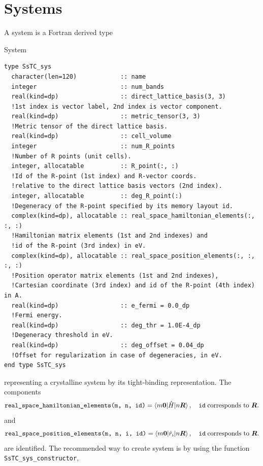 \documentclass[10pt,a4paper]{article}
\begin{document}
\section{Systems}
A system is a Fortran derived type
\begin{codebox}{System}
\begin{lstlisting}[caption={Derived type corresponding to a system.},captionpos=b]
type SsTC_sys
  character(len=120)            :: name
  integer                       :: num_bands
  real(kind=dp)                 :: direct_lattice_basis(3, 3)
  !1st index is vector label, 2nd index is vector component.
  real(kind=dp)                 :: metric_tensor(3, 3)
  !Metric tensor of the direct lattice basis.
  real(kind=dp)                 :: cell_volume
  integer                       :: num_R_points
  !Number of R points (unit cells).
  integer, allocatable          :: R_point(:, :)
  !Id of the R-point (1st index) and R-vector coords. 
  !relative to the direct lattice basis vectors (2nd index).
  integer, allocatable          :: deg_R_point(:)
  !Degeneracy of the R-point specified by its memory layout id.
  complex(kind=dp), allocatable :: real_space_hamiltonian_elements(:, :, :)
  !Hamiltonian matrix elements (1st and 2nd indexes) and 
  !id of the R-point (3rd index) in eV.
  complex(kind=dp), allocatable :: real_space_position_elements(:, :, :, :) 
  !Position operator matrix elements (1st and 2nd indexes), 
  !Cartesian coordinate (3rd index) and id of the R-point (4th index) in A.
  real(kind=dp)                 :: e_fermi = 0.0_dp
  !Fermi energy.
  real(kind=dp)                 :: deg_thr = 1.0E-4_dp
  !Degeneracy threshold in eV.
  real(kind=dp)                 :: deg_offset = 0.04_dp
  !Offset for regularization in case of degeneracies, in eV.
end type SsTC_sys
\end{lstlisting}
\end{codebox}
representing a crystalline system by its tight-binding \cite{marzariMaximallyLocalizedWannier2012} representation. The components
\begin{equation}
\verb|real_space_hamiltonian_elements(m, n, id)| = \braket{m\bm{0}|\hat{H}|n\bm{R}},\quad \verb|id|\;\text{corresponds to }\bm{R}.
\end{equation}
and
\begin{equation}
\verb|real_space_position_elements(m, n, i, id)| = \braket{m\bm{0}|\hat{r}_i|n\bm{R}},\quad \verb|id|\;\text{corresponds to }\bm{R}.
\end{equation}
are identified.
The recommended way to create system is by using the function \verb|SsTC_sys_constructor|,
\end{document}
